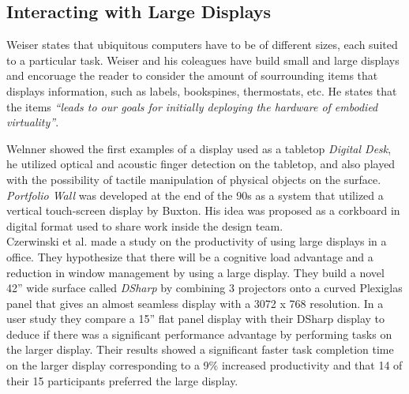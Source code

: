 \subsection{Interacting with Large Displays}
Weiser states that ubiquitous computers have to be of different sizes, each suited to a particular task. Weiser and his coleagues have build small and large displays and encoruage the reader to consider the amount of sourrounding items that displays information, such as labels, bookspines, thermostats, etc. He states that the items \emph{``leads to our goals for initially deploying the hardware of embodied virtuality''}.\cite{Weiser:1991} 

Welnner showed the first examples of a display used as a tabletop \emph{Digital Desk}, he utilized optical and acoustic finger detection on the tabletop, and also played with the possibility of tactile manipulation of physical objects on the surface.\cite{Wellner:1993} \emph{Portfolio Wall} was developed at the end of the 90s as a system that utilized a vertical touch-screen display by Buxton\cite{Buxton:2000}. His idea was proposed as a corkboard in digital format used to share work inside the design team.\\ %

Czerwinski et al. made a study on the productivity of using large displays in a office. They hypothesize that there will be a cognitive load advantage and a reduction in window management by using a large display. They build a novel 42'' wide surface called \emph{DSharp} by combining 3 projectors onto a curved Plexiglas panel that gives an almost seamless display with a 3072 x 768 resolution. In a user study they compare a 15'' flat panel display with their DSharp display to deduce if there was a significant performance advantage by performing tasks on the larger display. Their results showed a significant faster task completion time on the larger display corresponding to a 9\% increased productivity and that 14 of their 15 participants preferred the large display.

